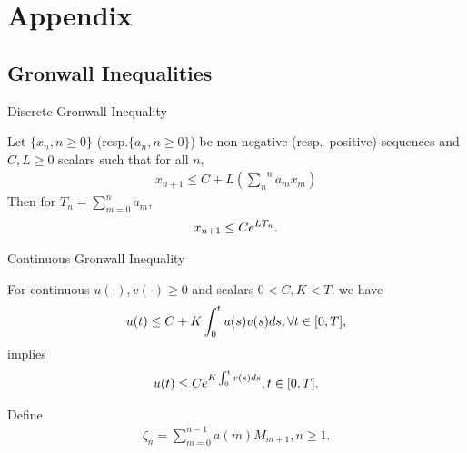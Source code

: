 \section{Appendix}\label{appendix}
\subsection{Gronwall Inequalities}
Discrete Gronwall Inequality
\begin{lemma}\label{gronwalld}
Let $\{x_n,n\geq 0\}$ (resp.$\{a_n,n\geq 0\}$) be non-negative (resp.~positive) sequences and $C, L\geq 0$ scalars such that for all $n$,
\begin{align}\label{ineq}
x_{n+1} \leq C+L(\overset{n}{\underset{n}{\sum}} a_m x_m)
\end{align}
Then for $T_n=\sum^{n}_{m=0} a_m$,
\begin{align}
x_{n+1}\leq Ce^{LT_n}.\nonumber
\end{align}
\end{lemma}
Continuous Gronwall Inequality
\begin{lemma}\label{gronwallc}
For continuous $u(\cdot), v(\cdot) \geq 0$ and scalars $0<C,K<T$, we have
\begin{align}
u(t)\leq C+K\int_0^t u(s)v(s) ds, \forall t \in [0,T],\nonumber\\
\end{align}
implies
\begin{align}
u(t)\leq Ce^{K\int_0^t v(s)ds}, t\in [0,T].\nonumber
\end{align}
\end{lemma}

Define
\begin{align}
\zeta_n=\sum_{m=0}^{n-1}a(m)M_{m+1}, n\geq 1.
\end{align}

